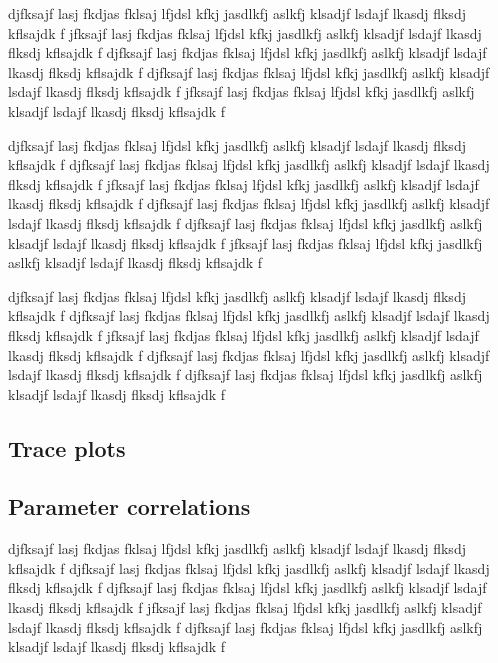 \documentclass[twocolumn]{../../common/aa}
\begin{document}
djfksajf lasj fkdjas fklsaj lfjdsl kfkj jasdlkfj aslkfj klsadjf lsdajf lkasdj flksdj kflsajdk f
jfksajf lasj fkdjas fklsaj lfjdsl kfkj jasdlkfj aslkfj klsadjf lsdajf lkasdj flksdj kflsajdk f
djfksajf lasj fkdjas fklsaj lfjdsl kfkj jasdlkfj aslkfj klsadjf lsdajf lkasdj flksdj kflsajdk f
djfksajf lasj fkdjas fklsaj lfjdsl kfkj jasdlkfj aslkfj klsadjf lsdajf lkasdj flksdj kflsajdk f
jfksajf lasj fkdjas fklsaj lfjdsl kfkj jasdlkfj aslkfj klsadjf lsdajf lkasdj flksdj kflsajdk f

djfksajf lasj fkdjas fklsaj lfjdsl kfkj jasdlkfj aslkfj klsadjf lsdajf lkasdj flksdj kflsajdk f
djfksajf lasj fkdjas fklsaj lfjdsl kfkj jasdlkfj aslkfj klsadjf lsdajf lkasdj flksdj kflsajdk f
jfksajf lasj fkdjas fklsaj lfjdsl kfkj jasdlkfj aslkfj klsadjf lsdajf lkasdj flksdj kflsajdk f
djfksajf lasj fkdjas fklsaj lfjdsl kfkj jasdlkfj aslkfj klsadjf lsdajf lkasdj flksdj kflsajdk f
djfksajf lasj fkdjas fklsaj lfjdsl kfkj jasdlkfj aslkfj klsadjf lsdajf lkasdj flksdj kflsajdk f
jfksajf lasj fkdjas fklsaj lfjdsl kfkj jasdlkfj aslkfj klsadjf lsdajf lkasdj flksdj kflsajdk f

djfksajf lasj fkdjas fklsaj lfjdsl kfkj jasdlkfj aslkfj klsadjf lsdajf lkasdj flksdj kflsajdk f
djfksajf lasj fkdjas fklsaj lfjdsl kfkj jasdlkfj aslkfj klsadjf lsdajf lkasdj flksdj kflsajdk f
jfksajf lasj fkdjas fklsaj lfjdsl kfkj jasdlkfj aslkfj klsadjf lsdajf lkasdj flksdj kflsajdk f
djfksajf lasj fkdjas fklsaj lfjdsl kfkj jasdlkfj aslkfj klsadjf lsdajf lkasdj flksdj kflsajdk f
djfksajf lasj fkdjas fklsaj lfjdsl kfkj jasdlkfj aslkfj klsadjf lsdajf lkasdj flksdj kflsajdk f


\subsection{Trace plots}
\label{sec:traceplots}

\subsection{Parameter correlations}
\label{sec:correlations}

djfksajf lasj fkdjas fklsaj lfjdsl kfkj jasdlkfj aslkfj klsadjf lsdajf lkasdj flksdj kflsajdk f
djfksajf lasj fkdjas fklsaj lfjdsl kfkj jasdlkfj aslkfj klsadjf lsdajf lkasdj flksdj kflsajdk f
djfksajf lasj fkdjas fklsaj lfjdsl kfkj jasdlkfj aslkfj klsadjf lsdajf lkasdj flksdj kflsajdk f
jfksajf lasj fkdjas fklsaj lfjdsl kfkj jasdlkfj aslkfj klsadjf lsdajf lkasdj flksdj kflsajdk f
djfksajf lasj fkdjas fklsaj lfjdsl kfkj jasdlkfj aslkfj klsadjf lsdajf lkasdj flksdj kflsajdk f
\end{document}
